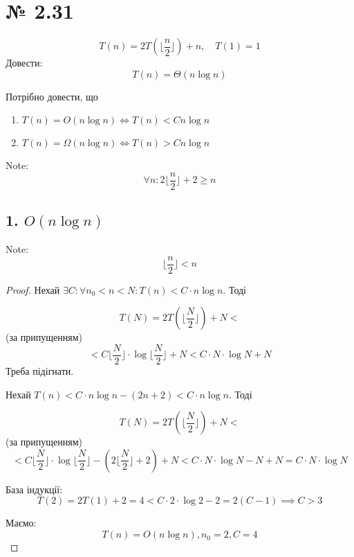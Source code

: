 \documentclass[11pt, a4paper]{article} %
\begin{document}

\section*{№ 2.31}
\begin{mdframed}
    $$T(n) = 2T(\lfloor \frac{n}{2} \rfloor) + n, \quad T(1) = 1$$
    Довести:
    $$T(n) = \Theta(n \log n)$$
\end{mdframed}

Потрібно довести, що
\begin{enumerate}
    \item $T(n) = O(n\log n) \iff T(n) < C n\log n$
    \item $T(n) = \Omega(n\log n) \iff T(n) > C n\log n$
\end{enumerate}

\begin{mdframed}[backgroundcolor=black!5]
    Note: $$\forall n: 2\lfloor \frac{n}{2} \rfloor + 2 \ge n$$
\end{mdframed}

\subsection*{1. $O(n\log n)$}

Note: $$\lfloor \frac{n}{2} \rfloor < n$$

\begin{proof}
Нехай $\exists C: \forall n_0<n < N: T(n) < C\cdot n\log n $. Тоді

$$T(N) = 2T(\lfloor \frac{N}{2} \rfloor) + N <$$
(за припущенням)
$$< C \lfloor \frac{N}{2} \rfloor \cdot \log \lfloor \frac{N}{2} \rfloor + N 
< C \cdot N \cdot \log N + N$$
Треба підігнати.

Нехай $T(n) < C\cdot n\log n - (2n+2) < C\cdot n \log n$. Тоді

$$T(N) = 2T(\lfloor \frac{N}{2} \rfloor) + N <$$
(за припущенням)
$$< C \lfloor \frac{N}{2} \rfloor \cdot \log \lfloor \frac{N}{2} \rfloor - (2\lfloor \frac{N}{2} \rfloor+2) + N
< C \cdot N \cdot \log N - N + N = C \cdot N \cdot \log N$$

База індукції:
$$T(2) = 2T(1)+2 = 4 < C\cdot 2 \cdot \log 2 - 2 = 2(C-1) \implies C > 3$$

Маємо: 
$$T(n) = O(n\log n), n_0 = 2, C = 4$$
\end{proof}
\end{document}

